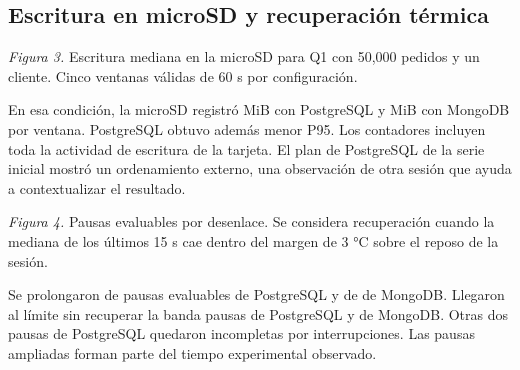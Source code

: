 \documentclass[10pt,a4paper]{article}
\begin{document}
\clearpage
\subsection{Escritura en microSD y recuperación térmica}
\begin{center}

\textit{Figura 3.} Escritura mediana en la microSD para Q1 con 50,000 pedidos y un cliente. Cinco ventanas válidas de 60 s por configuración.
\end{center}
En esa condición, la microSD registró \PgWrites{} MiB con PostgreSQL y \MongoWrites{} MiB con MongoDB por ventana. PostgreSQL obtuvo además menor P95. Los contadores incluyen toda la actividad de escritura de la tarjeta. El plan de PostgreSQL de la serie inicial mostró un ordenamiento externo, una observación de otra sesión que ayuda a contextualizar el resultado.

\begin{center}

\textit{Figura 4.} Pausas evaluables por desenlace. Se considera recuperación cuando la mediana de los últimos 15 s cae dentro del margen de 3 °C sobre el reposo de la sesión.
\end{center}
Se prolongaron \PgCoolingProlonged{} de \PgCoolingEvaluable{} pausas evaluables de PostgreSQL y \MongoCoolingProlonged{} de \MongoCoolingEvaluable{} de MongoDB. Llegaron al límite sin recuperar la banda \PgCoolingUnrecovered{} pausas de PostgreSQL y \MongoCoolingUnrecovered{} de MongoDB. Otras dos pausas de PostgreSQL quedaron incompletas por interrupciones. Las pausas ampliadas forman parte del tiempo experimental observado.
\end{document}
